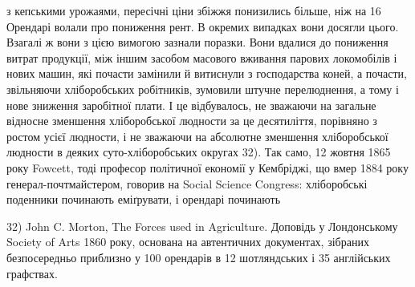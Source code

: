 з кепськими урожаями, пересічні ціни збіжжя понизились більше, ніж на 16%
Орендарі волали про пониження рент. В окремих випадках вони досягли цього.
Взагалі ж вони з цією вимогою зазнали поразки. Вони вдалися до пониження
витрат продукції, між іншим засобом масового вживання парових
локомобілів і нових машин, які почасти замінили й витиснули з господарства
коней, а почасти, звільняючи хліборобських робітників, зумовили
штучне перелюднення, а тому і нове зниження заробітної плати. І це відбувалось,
не зважаючи на загальне відносне зменшення хліборобської людности за це
десятиліття, порівняно з ростом усієї людности, і не зважаючи на абсолютне зменшення
хліборобської людности в деяких суто-хліборобських округах 32). Так
само, 12 жовтня 1865 року Fowcett, тоді професор політичної економії у Кембріджі,
що вмер 1884 року генерал-почтмайстером, говорив на Social Science
Congress: хліборобські поденники починають еміґрувати, і орендарі починають

32) John C. Morton, The Forces used in Agriculture. Доповідь у Лондонському Society of Arts 1860
року, основана на автентичних документах, зібраних безпосередньо приблизно у 100 орендарів в 12
шотляндських і 35 англійських графствах.
